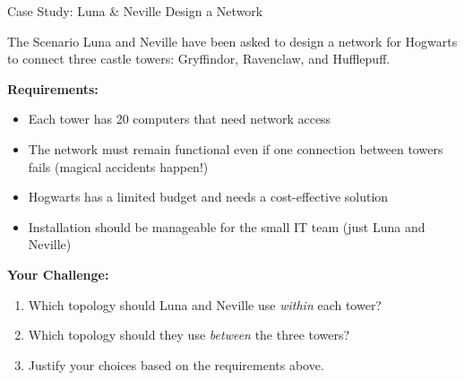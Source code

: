 \documentclass[aspectratio=169]{beamer}
\begin{document}
\begin{frame}{Case Study: Luna \& Neville Design a Network}

\begin{alertblock}{The Scenario}
Luna and Neville have been asked to design a network for Hogwarts to connect three castle towers: Gryffindor, Ravenclaw, and Hufflepuff.
\end{alertblock}

\vspace{0.3cm}

\textbf{Requirements:}
\begin{itemize}
    \item Each tower has 20 computers that need network access
    \item The network must remain functional even if one connection between towers fails (magical accidents happen!)
    \item Hogwarts has a limited budget and needs a cost-effective solution
    \item Installation should be manageable for the small IT team (just Luna and Neville)
\end{itemize}

\vspace{0.3cm}

\textbf{Your Challenge:}
\begin{enumerate}
    \item Which topology should Luna and Neville use \emph{within} each tower?
    \item Which topology should they use \emph{between} the three towers?
    \item Justify your choices based on the requirements above.
\end{enumerate}

\end{frame}
\end{document}
